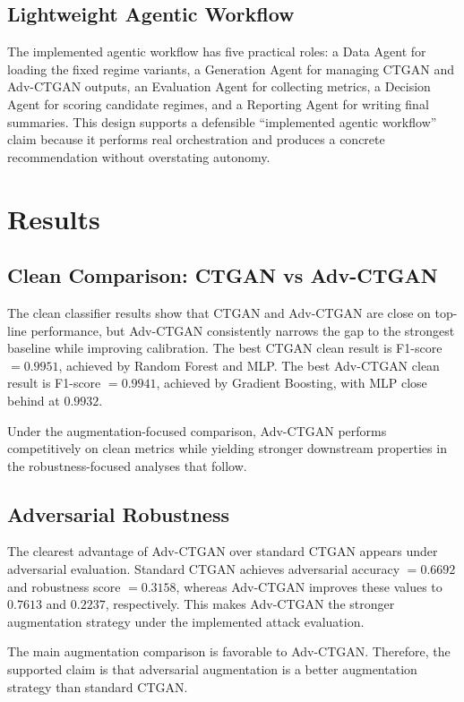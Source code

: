 \documentclass[conference]{IEEEtran}
\begin{document}
\subsection{Lightweight Agentic Workflow}

The implemented agentic workflow has five practical roles: a Data Agent for loading the fixed regime variants, a Generation Agent for managing CTGAN and Adv-CTGAN outputs, an Evaluation Agent for collecting metrics, a Decision Agent for scoring candidate regimes, and a Reporting Agent for writing final summaries. This design supports a defensible ``implemented agentic workflow'' claim because it performs real orchestration and produces a concrete recommendation without overstating autonomy.

\section{Results}

\subsection{Clean Comparison: CTGAN vs Adv-CTGAN}

The clean classifier results show that CTGAN and Adv-CTGAN are close on top-line performance, but Adv-CTGAN consistently narrows the gap to the strongest baseline while improving calibration. The best CTGAN clean result is F1-score $= 0.9951$, achieved by Random Forest and MLP. The best Adv-CTGAN clean result is F1-score $= 0.9941$, achieved by Gradient Boosting, with MLP close behind at $0.9932$.

Under the augmentation-focused comparison, Adv-CTGAN performs competitively on clean metrics while yielding stronger downstream properties in the robustness-focused analyses that follow.

\subsection{Adversarial Robustness}

The clearest advantage of Adv-CTGAN over standard CTGAN appears under adversarial evaluation. Standard CTGAN achieves adversarial accuracy $= 0.6692$ and robustness score $= 0.3158$, whereas Adv-CTGAN improves these values to $0.7613$ and $0.2237$, respectively. This makes Adv-CTGAN the stronger augmentation strategy under the implemented attack evaluation.

The main augmentation comparison is favorable to Adv-CTGAN. Therefore, the supported claim is that adversarial augmentation is a better augmentation strategy than standard CTGAN.
\end{document}
